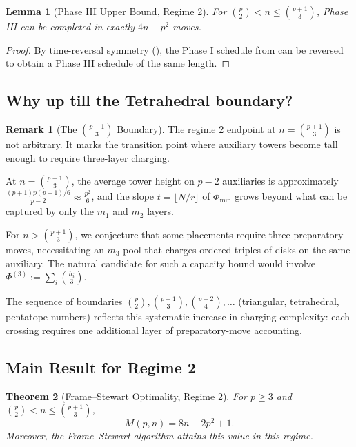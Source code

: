 \documentclass[11pt]{article}
\newtheorem{theorem}{Theorem}
\newtheorem{lemma}[theorem]{Lemma}
\theoremstyle{definition}
\newtheorem{remark}{Remark}
\begin{document}
\begin{lemma}[Phase III Upper Bound, Regime 2]\label{lem:phase3-upper-regime2}
For $\binom{p}{2} < n \leq \binom{p+1}{3}$, Phase III can be completed in exactly $4n - p^2$ moves.
\end{lemma}

\begin{proof}
By time-reversal symmetry (), the Phase I schedule from  can be reversed to obtain a Phase III schedule of the same length.
\end{proof}

\subsection{Why up till the Tetrahedral boundary?}

\begin{remark}[The $\binom{p+1}{3}$ Boundary]
The regime 2 endpoint at $n = \binom{p+1}{3}$ is not arbitrary. It marks the transition point where auxiliary towers become tall enough to require three-layer charging. 

At $n = \binom{p+1}{3}$, the average tower height on $p-2$ auxiliaries is approximately $\frac{(p+1)p(p-1)/6}{p-2} \approx \frac{p^2}{6}$, and the slope $t = \lfloor N/r \rfloor$ of $\Phi_{\min}$ grows beyond what can be captured by only the $m_1$ and $m_2$ layers.

For $n > \binom{p+1}{3}$, we conjecture that some placements require three preparatory moves, necessitating an $m_3$-pool that charges ordered triples of disks on the same auxiliary. The natural candidate for such a capacity bound would involve $\Phi^{(3)} := \sum_i \binom{h_i}{3}$.

The sequence of boundaries $\binom{p}{2}, \binom{p+1}{3}, \binom{p+2}{4}, \dots$ (triangular, tetrahedral, pentatope numbers) reflects this systematic increase in charging complexity: each crossing requires one additional layer of preparatory-move accounting.
\end{remark}

\subsection{Main Result for Regime 2}

\begin{theorem}[Frame--Stewart Optimality, Regime 2]\label{thm:regime2}
For $p \geq 3$ and $\binom{p}{2} < n \leq \binom{p+1}{3}$,
\[
M(p,n) = 8n - 2p^2 + 1.
\]
Moreover, the Frame--Stewart algorithm attains this value in this regime.
\end{theorem}
\end{document}
